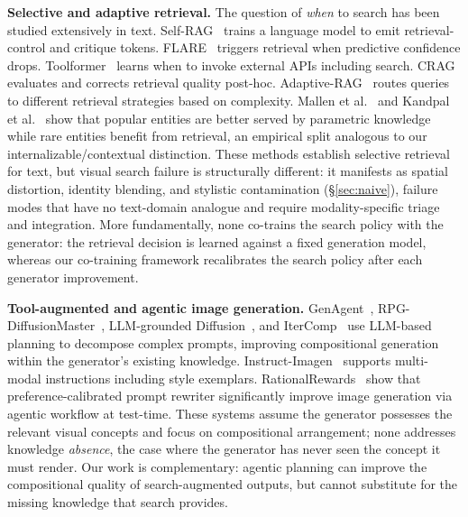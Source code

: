 \documentclass{article}
\begin{document}
\textbf{Selective and adaptive retrieval.}
The question of \emph{when} to search has been studied extensively in text.
Self-RAG~\cite{asai2024selfrag} trains a language model to emit retrieval-control and critique tokens.
FLARE~\cite{jiang2023flare} triggers retrieval when predictive confidence drops.
Toolformer~\cite{schick2023toolformer} learns when to invoke external APIs including search.
CRAG~\cite{yan2024crag} evaluates and corrects retrieval quality post-hoc.
Adaptive-RAG~\cite{jeong2024adaptiverag} routes queries to different retrieval strategies based on complexity.
Mallen et al.~\cite{mallen2023nottrust} and Kandpal et al.~\cite{kandpal2023entities} show that popular entities are better served by parametric knowledge while rare entities benefit from retrieval, an empirical split analogous to our internalizable/contextual distinction.
These methods establish selective retrieval for text, but visual search failure is structurally different: it manifests as spatial distortion, identity blending, and stylistic contamination (\S\ref{sec:naive}), failure modes that have no text-domain analogue and require modality-specific triage and integration.
More fundamentally, none co-trains the search policy with the generator: the retrieval decision is learned against a fixed generation model, whereas our co-training framework recalibrates the search policy after each generator improvement.

\textbf{{Tool-augmented and agentic} image generation.}
GenAgent~\cite{genagent2024}, RPG-DiffusionMaster~\cite{yang2024rpg}, LLM-grounded Diffusion~\cite{lian2024lmd}, and IterComp~\cite{zhang2024itercomp} use LLM-based planning to decompose complex prompts, improving compositional generation within the generator's existing knowledge.
Instruct-Imagen~\cite{hu2024instructimagen} supports multi-modal instructions including style exemplars. RationalRewards~\cite{wang2026rationalrewards} show that preference-calibrated prompt rewriter significantly improve image generation via agentic workflow at test-time.
These systems assume the generator possesses the relevant visual concepts and focus on compositional arrangement; none addresses knowledge \emph{absence}, the case where the generator has never seen the concept it must render.
Our work is complementary: agentic planning can improve the compositional quality of search-augmented outputs, but cannot substitute for the missing knowledge that search provides.
 
\end{document}
